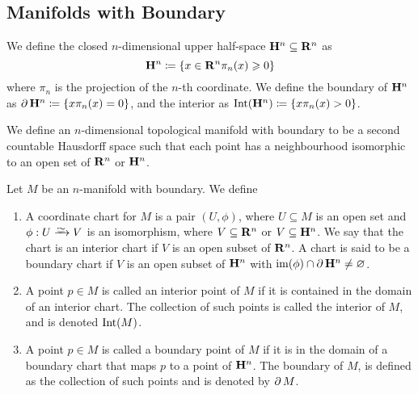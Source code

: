 \subsection{Manifolds with Boundary}

\begin{definition}\label{def:upper-half-space}
    We define the closed \(n\)-dimensional upper half-space \(\mathbf{H}^n \subseteq
    \mathbf{R}^n\) as
    \[
        \mathbf{H}^n \coloneq \{x \in \mathbf{R}^n \relax \pi_n(x) \geqslant 0\}
    \]
    where \(\pi_n\) is the projection of the \(n\)-th coordinate. We define the
    boundary of \(\mathbf{H}^n\) as \(\operatorname{\partial} \mathbf{H}^n \coloneq \{x \relax \pi_n(x) = 0\}\),
    and the interior as \(\operatorname{Int}(\mathbf{H}^n) \coloneq \{x \relax \pi_n(x) > 0\}\).
\end{definition}

\begin{definition}
    \label{def: manifold with boundary}
    We define an \(n\)-dimensional topological manifold with boundary to be a
    second countable Hausdorff space such that each point has a neighbourhood
    isomorphic to an open set of \(\mathbf{R}^n\) or \(\mathbf{H}^n\).
\end{definition}

\begin{definition}[Miscellaneous]
    Let \(M\) be an \(n\)-manifold with boundary. We define
    \begin{enumerate}[(MB1)]
        \item A coordinate chart for \(M\) is a pair \((U, \phi)\), where \(U
              \subseteq M\) is an open set and \(\phi: U \isoto V\) is an isomorphism,
              where \(V \subseteq \mathbf{R}^n\) or \(V \subseteq \mathbf{H}^n\). We say that the chart
              is an interior chart if \(V\) is an open subset of \(\mathbf{R}^n\). A chart is said
              to be a boundary chart if \(V\) is an open subset of \(\mathbf{H}^n\) with
              \(\operatorname{im}(\phi) \cap \operatorname{\partial} \mathbf{H}^n \neq \varnothing\).
        \item A point \(p \in M\) is called an interior point of \(M\) if it is
              contained in the domain of an interior chart. The collection of such
              points is called the interior of \(M\), and is denoted \(\operatorname{Int}(M)\).
        \item A point \(p \in M\) is called a boundary point of \(M\) if it is in
              the domain of a boundary chart that maps \(p\) to a point of
              \(\mathbf{H}^n\). The boundary of \(M\), is defined as the collection of
              such points and is denoted by \(\operatorname{\partial} M\).
    \end{enumerate}
\end{definition}

